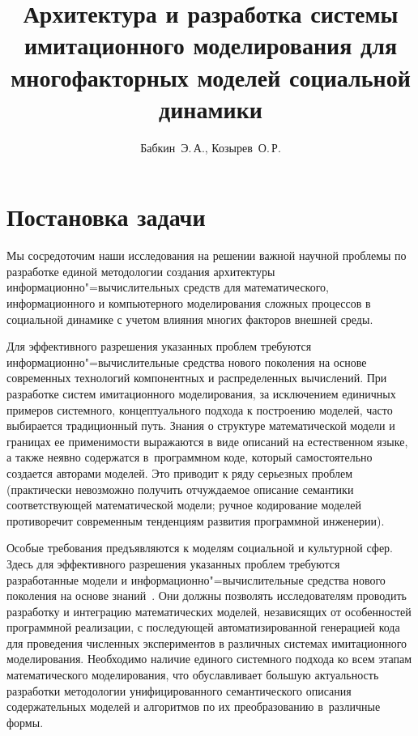 \documentclass[twoside]{article}
\begin{document}
\title[Архитектура и разработка системы имитационного моделирования]%
    {Архитектура и разработка системы имитационного моделирования
    для многофакторных моделей социальной динамики}
\author{Бабкин~Э.\,А., Козырев~О.\,Р.}
\maketitle

\section{Постановка задачи}
Мы сосредоточим наши исследования на решении важной научной проблемы по
разработке единой методологии создания архитектуры информационно"=вычислительных
средств для математического, информационного и компьютерного моделирования
сложных процессов в социальной динамике с учетом влияния многих факторов
внешней среды.

Для эффективного разрешения указанных проблем требуются
информационно"=вычислительные средства нового поколения на основе современных
технологий компонентных и распределенных вычислений. При разработке систем
имитационного моделирования, за исключением единичных примеров системного,
концептуального подхода к построению моделей, часто выбирается традиционный
путь. Знания о структуре математической модели и границах ее применимости
выражаются в виде описаний на естественном языке, а также неявно содержатся
в~программном коде, который самостоятельно создается авторами моделей.
Это приводит к ряду серьезных проблем (практически невозможно получить
отчуждаемое описание семантики соответствующей математической модели;
ручное кодирование моделей противоречит современным тенденциям развития
программной инженерии).

Особые требования предъявляются к моделям социальной
и культурной сфер. Здесь для эффективного разрешения указанных проблем
требуются разработанные модели и информационно"=вычислительные средства нового
поколения на основе знаний~\cite{2,3}. Они должны позволять исследователям
проводить разработку и интеграцию математических моделей, независящих от
особенностей программной реализации, с последующей автоматизированной
генерацией кода для проведения численных экспериментов в различных системах
имитационного моделирования. Необходимо наличие единого системного подхода ко
всем этапам математического моделирования, что обуславливает большую актуальность
разработки методологии унифицированного семантического описания содержательных
моделей и алгоритмов по их преобразованию в~различные формы.
\end{document}
